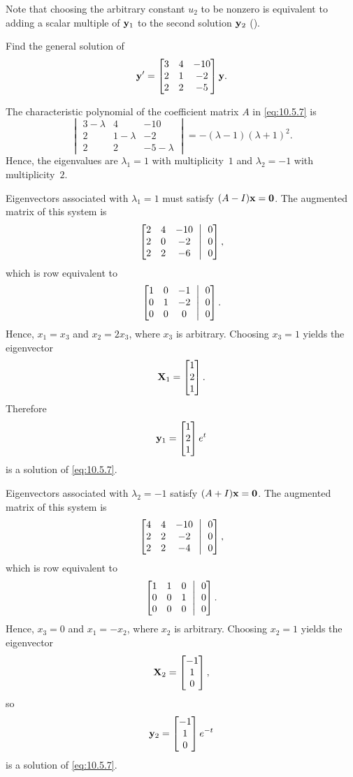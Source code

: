 Note that choosing the arbitrary constant $u_2$ to be nonzero is
equivalent to adding a scalar multiple of $\mathbf{y}_1$ to the second
solution $\mathbf{y}_2$ ().

\begin{example}\label{example:10.5.3}
 Find the general solution of
\begin{equation}\label{eq:10.5.7}
\mathbf{y}'=\begin{bmatrix}3&4&-10\\2&1&-2\\2&2&-5\end{bmatrix} \mathbf{y}.
\end{equation}
\end{example}

\begin{solution}
The characteristic polynomial of
the coefficient matrix $A$ in  \eqref{eq:10.5.7} is
\[
\begin{vmatrix}
3-\lambda & 4 & -10\\ 2 & 1-\lambda &-2\\ 2 & 2 &-5-\lambda
\end{vmatrix} =-
(\lambda-1)(\lambda+1)^2.
\]
Hence, the eigenvalues are $\lambda_1=1$ with multiplicity~$1$ and
$\lambda_2=-1$ with  multiplicity~$2$.

Eigenvectors associated with $\lambda_1=1$ must satisfy $(A-I)\mathbf{x}=\mathbf{0}$. The augmented matrix of this system is
\[
\amatrix{2&4&-10\\2&0&-2\\2&2&-6}{0\\0\\0},
\]
which is row equivalent to
\[
\amatrix{1&0&-1\\0&1&-2\\0&0&0}{0\\0\\0}.
\]
Hence, $x_1 =x_3$ and  $x_2 =2 x_3$, where $x_3$ is arbitrary.
Choosing $x_3=1$ yields the eigenvector
\[
\mathbf{X}_1=\begin{bmatrix}1\\2\\1\end{bmatrix}.
\]
Therefore
\[
\mathbf{y}_1 =\begin{bmatrix}1\\2\\1\end{bmatrix}e^t
\]
is a solution of  \eqref{eq:10.5.7}.

Eigenvectors associated with $\lambda_2 =-1$ satisfy $(A+I)\mathbf{x}=\mathbf{0}$. The  augmented matrix of this system is
\[
\amatrix{4&4&-10\\2&2&-2\\2&2&-4}{0\\0\\0},
\]
which is row equivalent to
\[
\amatrix{1&1&0\\0&0&1\\0&0&0}{0\\0\\0}.
\]
Hence, $x_3=0$ and $x_1 =-x_2$, where $x_2$ is
arbitrary. Choosing $x_2=1$  yields the eigenvector
\[
\mathbf{X}_2=\begin{bmatrix}-1\\1\\0\end{bmatrix},
\]
so
\[
\mathbf{y}_2 =\begin{bmatrix}-1\\1\\0\end{bmatrix}e^{-t}
\]
is a solution of  \eqref{eq:10.5.7}.


\end{solution}
